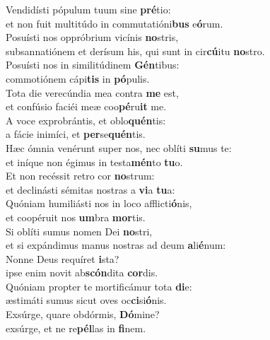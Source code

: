 \evenverse Vendidísti pópulum tuum sine \textbf{pré}tio:~\*\\
\evenverse et non fuit multitúdo in commutatióni\textbf{bus} e\textbf{ó}rum.\\
\oddverse Posuísti nos oppróbrium vicínis \textbf{no}stris,~\*\\
\oddverse subsannatiónem et derísum his, qui sunt in cir\textbf{cú}itu \textbf{no}stro.\\
\evenverse Posuísti nos in similitúdinem \textbf{Gén}tibus:~\*\\
\evenverse commotiónem cápi\textbf{tis} in \textbf{pó}pulis.\\
\oddverse Tota die verecúndia mea contra \textbf{me} est,~\*\\
\oddverse et confúsio faciéi meæ coo\textbf{pé}ru\textbf{it} me.\\
\evenverse A voce exprobrántis, et oblo\textbf{quén}tis:~\*\\
\evenverse a fácie inimíci, et \textbf{per}se\textbf{quén}tis.\\
\oddverse Hæc ómnia venérunt super nos, nec oblíti \textbf{su}mus te:~\*\\
\oddverse et iníque non égimus in testa\textbf{mén}to \textbf{tu}o.\\
\evenverse Et non recéssit retro cor \textbf{no}strum:~\*\\
\evenverse et declinásti sémitas nostras a \textbf{vi}a \textbf{tu}a:\\
\oddverse Quóniam humiliásti nos in loco afflicti\textbf{ó}nis,~\*\\
\oddverse et coopéruit nos \textbf{um}bra \textbf{mor}tis.\\
\evenverse Si oblíti sumus nomen Dei \textbf{no}stri,~\*\\
\evenverse et si expándimus manus nostras ad deum \textbf{a}li\textbf{é}num:\\
\oddverse Nonne Deus requíret \textbf{i}sta?~\*\\
\oddverse ipse enim novit ab\textbf{scón}dita \textbf{cor}dis.\\
\evenverse Quóniam propter te mortificámur tota \textbf{di}e:~\*\\
\evenverse æstimáti sumus sicut oves oc\textbf{ci}si\textbf{ó}nis.\\
\oddverse Exsúrge, quare obdórmis, \textbf{Dó}mine?~\*\\
\oddverse exsúrge, et ne re\textbf{pél}las in \textbf{fi}nem.\\
